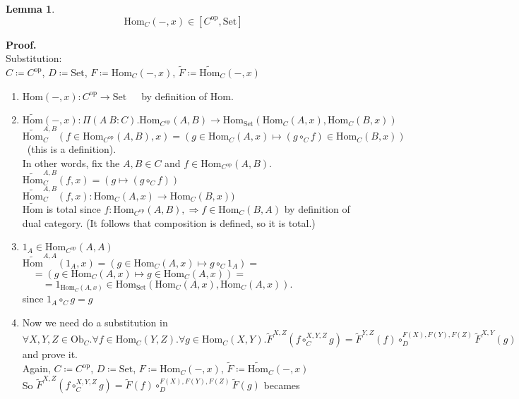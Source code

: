 \documentclass[10pt,a4paper]{article}
\theoremstyle{definition}
\newtheorem{lemma}{Lemma}[section]
\newcommand{\Ob}{{\mbox{Ob}}}
\newcommand{\Hom}{{\mbox{Hom}}}
\newcommand{\HomMor}{{\widetilde{\Hom}\mbox{}}}
\newcommand{\FMor}{{\widetilde{F}\mbox{}}}
\newcommand{\op}{{\mbox{op}}}
\newcommand{\Set}{{\mbox{Set}}}
\newcommand{\myprf}{\noindent\textbf{Proof.}}
\begin{document}
\begin{lemma}
$$\Hom_C(-, x) \in [C^\op,\Set]$$
\end{lemma}

\myprf\\
Substitution:\\
$C \coloneqq C^\op$, 
$D \coloneqq \Set$, 
$F \coloneqq \Hom_C(-,x)$, 
$\FMor \coloneqq \HomMor_C(-,x)$\\
\begin{enumerate}
\item $\Hom(-, x) : C^\op \to \Set$\ \ \ by definition of $\Hom$.
\item $\HomMor(-, x) :\Pi(A\ B:C).\Hom_{C^\op}(A,B) \to \Hom_\Set(\Hom_C(A,x), \Hom_C(B,x))$\\
$\HomMor_C^{A,B}(f\in\Hom_{C^\op}(A,B), x) = (g \in\Hom_C(A,x) \mapsto (g \circ_C f) \in\Hom_C(B,x))$\ (this is a definition).\\
In other words, fix the $A,B\in C$ and $f\in\Hom_{C^\op}(A,B)$.\\
$\HomMor_C^{A,B}(f, x) = (g\mapsto (g \circ_C f))$\\
$\HomMor_C^{A,B}(f, x) : \Hom_C(A,x) \to \Hom_C(B,x))$
\\
$\HomMor$ is total since $f:\Hom_{C^\op}(A,B), \Rightarrow f\in\Hom_C(B,A)$ by definition of dual category. (It follows that composition is defined, so it is total.)
\item $1_A\in\Hom_{C^\op}(A,A)$\\
$\HomMor^{A,A}(1_A, x) = \left(g \in\Hom_C(A,x)\mapsto g \circ_C 1_A\right) = $\\
$\quad = \left(g \in\Hom_C(A,x) \mapsto g \in\Hom_C(A,x)\right) =$\\
$\quad \quad = 1_{\Hom_C(A,x)} \in \Hom_\Set\left(\Hom_C(A,x), \Hom_C(A,x)\right).$\\
since $1_A \circ_C g = g$\\
\item Now we need do a substitution in
$\forall X,Y,Z \in \Ob_C.\forall f\in\Hom_C(Y,Z).\forall g\in\Hom_C(X,Y). \FMor^{X,Z}(f\circ_C^{X,Y,Z} g)=\FMor^{Y,Z}(f)\circ_D^{F(X),F(Y),F(Z)} \FMor^{X,Y}(g)$ and prove it.\\
Again, $C \coloneqq C^\op$, 
$D \coloneqq \Set$, 
$F \coloneqq \Hom_C(-,x)$, 
$\FMor \coloneqq \HomMor_C(-,x)$\\
So $\FMor^{X,Z}(f\circ_C^{X,Y,Z} g)=\FMor(f)\circ_D^{F(X),F(Y),F(Z)} \FMor(g)$ becames\\

\end{enumerate}
\end{document}
